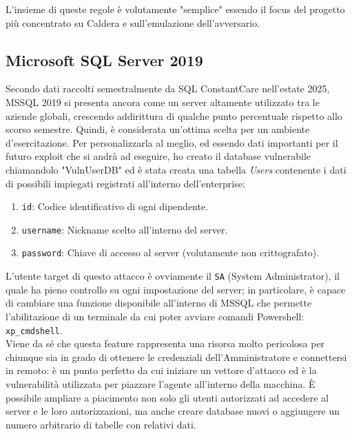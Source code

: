     L'insieme di queste regole è volutamente "semplice" essendo il focus del progetto più concentrato su Caldera e sull'emulazione dell'avversario.\\
    
    \subsection{Microsoft SQL Server 2019}
    Secondo dati raccolti semestralmente da SQL ConstantCare\textregistered\cite{mssql} nell'estate 2025, MSSQL 2019 si presenta ancora come un server altamente utilizzato tra le aziende globali, crescendo addirittura di qualche punto percentuale rispetto allo scorso semestre. Quindi, è considerata un'ottima scelta per un ambiente d'esercitazione. Per personalizzarla al meglio, ed essendo dati importanti per il futuro exploit che si andrà ad eseguire, ho creato il database vulnerabile chiamandolo "VulnUserDB" ed è stata creata una tabella \textit{Users} contenente i dati di possibili impiegati registrati all'interno dell'enterprise:
    \begin{enumerate}
        \item \texttt{id}: Codice identificativo di ogni dipendente.
        \item \texttt{username}: Nickname scelto all'interno del server.
        \item \texttt{password}: Chiave di accesso al server (volutamente non crittografato).
    \end{enumerate}
    L'utente target di questo attacco è ovviamente il \texttt{SA} (System Administrator), il quale ha pieno controllo su ogni impostazione del server; in particolare, è capace di cambiare una funzione disponibile all'interno di MSSQL che permette l'abilitazione di un terminale da cui poter avviare comandi Powershell: \texttt{xp\_cmdshell}.\\
    Viene da sé che questa feature rappresenta una risorsa molto pericolosa per chiunque sia in grado di ottenere le credenziali dell'Amministratore e connettersi in remoto: è un punto perfetto da cui iniziare un vettore d'attacco ed è la vulnerabilità utilizzata per piazzare l'agente all'interno della macchina. È possibile ampliare a piacimento non solo gli utenti autorizzati ad accedere al server e le loro autorizzazioni, ma anche creare database nuovi o aggiungere un numero arbitrario di tabelle con relativi dati.\\
    
